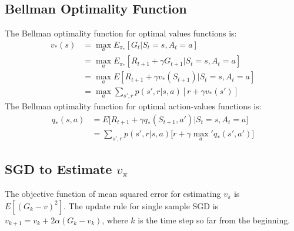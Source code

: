 \documentclass[twoside]{article}
\begin{document}
\subsection{Bellman Optimality Function}

The Bellman optimality function for optimal values functions is: 
\begin{align*}
v_*(s) &= \max_a E_{\pi_*}[G_t | S_t=s, A_t=a] \\
&= \max_a E_{\pi_*}[R_{t+1} + \gamma G_{t+1} | S_t=s, A_t=a] \\
&= \max_a E[R_{t+1} + \gamma v_*(S_{t+1}) | S_t=s, A_t=a] \\
&= \max_a \sum_{s', r}p(s', r|s,a)[r+\gamma v_*(s')]
\end{align*}
The Bellman optimality function for optimal action-values functions is:
\begin{align*}
q_*(s, a) &= E\Big[ R_{t+1} + \gamma q_*(S_{t+1}, a') \Big| S_t=s, A_t=a \Big] \\
&= \sum_{s',r}p(s', r|s,a)\Big[ r+ \gamma\max_a' q_*(s', a') \Big]
\end{align*}

\subsection{SGD to Estimate $v_\pi$}

The objective function of mean squared error for estimating $ v_\pi $ is $E[(G_k - v)^2]$. The update rule for single sample SGD is $ v_{k+1} = v_k + 2\alpha(G_k - v_k) $, where $ k $ is the time step so far from the beginning.
\end{document}

